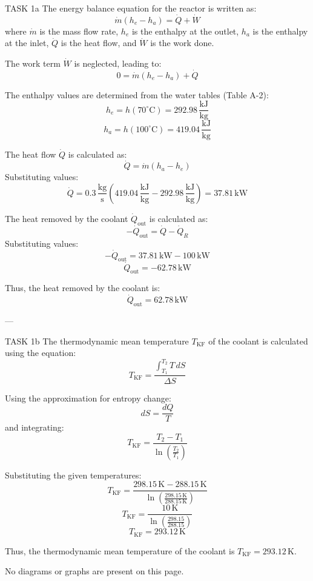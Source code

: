 TASK 1a  
The energy balance equation for the reactor is written as:  
\[
\dot{m} \left( h_e - h_a \right) = \dot{Q} + \dot{W}
\]  
where \(\dot{m}\) is the mass flow rate, \(h_e\) is the enthalpy at the outlet, \(h_a\) is the enthalpy at the inlet, \(\dot{Q}\) is the heat flow, and \(\dot{W}\) is the work done.  

The work term \(\dot{W}\) is neglected, leading to:  
\[
0 = \dot{m} \left( h_e - h_a \right) + \dot{Q}
\]  

The enthalpy values are determined from the water tables (Table A-2):  
\[
h_e = h \left( 70^\circ\text{C} \right) = 292.98 \, \frac{\text{kJ}}{\text{kg}}
\]  
\[
h_a = h \left( 100^\circ\text{C} \right) = 419.04 \, \frac{\text{kJ}}{\text{kg}}
\]  

The heat flow \(\dot{Q}\) is calculated as:  
\[
\dot{Q} = \dot{m} \left( h_a - h_e \right)
\]  
Substituting values:  
\[
\dot{Q} = 0.3 \, \frac{\text{kg}}{\text{s}} \left( 419.04 \, \frac{\text{kJ}}{\text{kg}} - 292.98 \, \frac{\text{kJ}}{\text{kg}} \right) = 37.81 \, \text{kW}
\]  

The heat removed by the coolant \(\dot{Q}_{\text{out}}\) is calculated as:  
\[
-\dot{Q}_{\text{out}} = \dot{Q} - \dot{Q}_R
\]  
Substituting values:  
\[
-\dot{Q}_{\text{out}} = 37.81 \, \text{kW} - 100 \, \text{kW}
\]  
\[
\dot{Q}_{\text{out}} = -62.78 \, \text{kW}
\]  

Thus, the heat removed by the coolant is:  
\[
\dot{Q}_{\text{out}} = 62.78 \, \text{kW}
\]  

---

TASK 1b  
The thermodynamic mean temperature \(T_{\text{KF}}\) of the coolant is calculated using the equation:  
\[
T_{\text{KF}} = \frac{\int_{T_1}^{T_2} T \, dS}{\Delta S}
\]  

Using the approximation for entropy change:  
\[
dS = \frac{dQ}{T}
\]  
and integrating:  
\[
T_{\text{KF}} = \frac{T_2 - T_1}{\ln \left( \frac{T_2}{T_1} \right)}
\]  

Substituting the given temperatures:  
\[
T_{\text{KF}} = \frac{298.15 \, \text{K} - 288.15 \, \text{K}}{\ln \left( \frac{298.15 \, \text{K}}{288.15 \, \text{K}} \right)}
\]  
\[
T_{\text{KF}} = \frac{10 \, \text{K}}{\ln \left( \frac{298.15}{288.15} \right)}
\]  
\[
T_{\text{KF}} = 293.12 \, \text{K}
\]  

Thus, the thermodynamic mean temperature of the coolant is \(T_{\text{KF}} = 293.12 \, \text{K}\).  

No diagrams or graphs are present on this page.